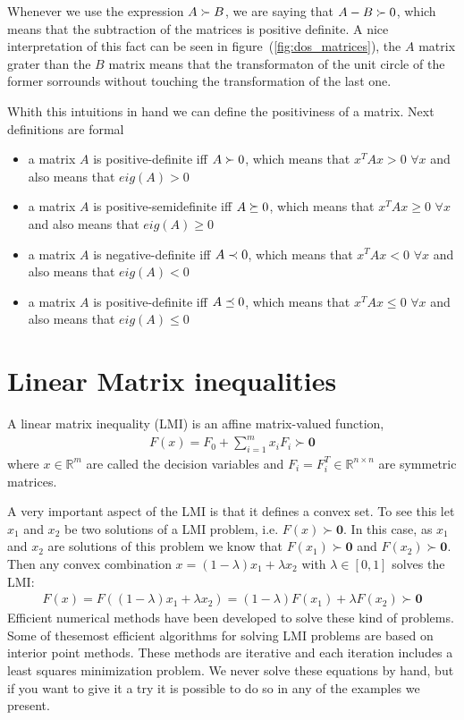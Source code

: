 \documentclass[nols]{tufte-handout}
\theoremstyle{definition}
\begin{document}
Whenever we use the expression $A\succ B$, we are saying that $A-B\succ 0$, which means that the subtraction of the matrices is positive definite. A nice interpretation of this fact can be seen in figure~(\ref{fig:dos_matrices}), the $A$ matrix grater than the $B$ matrix means that the transformaton of the unit circle of the former sorrounds without touching the transformation of the last one.

Whith this intuitions in hand we can define the positiviness of a matrix. Next definitions are formal
\begin{itemize}
    \item a matrix $A$ is positive-definite iff $A\succ 0$, which means that $x^TAx>0\,\,\forall x$ and also means that $eig(A)>0$
    \item a matrix $A$ is positive-semidefinite iff $A\succeq 0$, which means that $x^TAx\geq 0\,\,\forall x$ and also means that $eig(A)\geq0$
    \item a matrix $A$ is negative-definite iff $A\prec 0$, which means that $x^TAx<0\,\,\forall x$ and also means that $eig(A)<0$
    \item a matrix $A$ is positive-definite iff $A\preceq 0$, which means that $x^TAx\leq0\,\,\forall x$ and also means that $eig(A)\leq0$
\end{itemize}

\section{Linear Matrix inequalities}

A linear matrix inequality (LMI) is an affine matrix-valued function,
\begin{align}\label{eq:lmi}
    F(x)=F_0+\sum_{i=1}^{m} x_iF_i\succ \mathbf{0}
\end{align}
where $x \in \mathbb{R}^m$ are called the decision variables and $F_i = F_i^T \in \mathbb{R}^{n\times n}$ are
symmetric matrices.

A very important aspect of the LMI is that it defines a convex set. To see this let 
$x_1$ and $x_2$ be two solutions of a LMI problem, i.e. $F(x)\succ\mathbf{0}$. In this case, as $x_1$ and $x_2$ are solutions of this problem we know that $F(x_1)\succ\mathbf{0}$ and  $F(x_2)\succ\mathbf{0}$. Then any convex combination $x=(1-\lambda)x_1+\lambda x_2$ with $\lambda \in [0, 1]$ solves the LMI:
\begin{align}  
    F(x) = F((1 - \lambda)x_1 + \lambda x_2 ) = (1 - \lambda)F (x_1 ) + \lambda F(x_2 )\succ \mathbf{0}
\end{align}
Efficient numerical methods have been developed to solve these kind of problems.
Some of thesemost efficient algorithms for solving LMI problems are based on
interior point methods. These methods are iterative and each iteration includes
a least squares minimization problem. We never solve these equations by hand, but if you want to give it a try it is possible to do so in any of the examples we present. 
\end{document}
